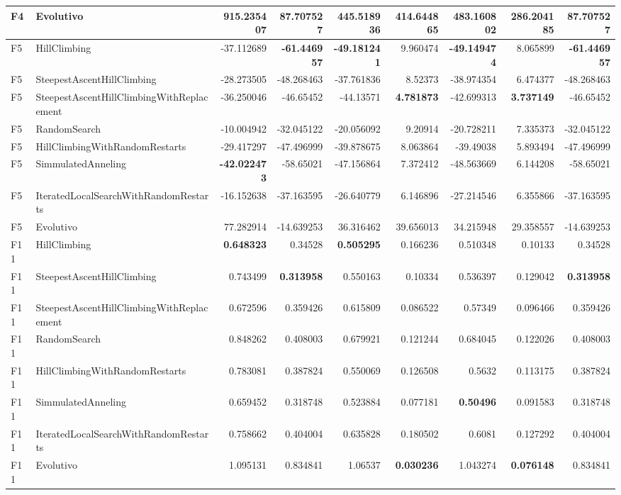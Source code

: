 \begin{tabular}{llrrrrrrr}
F4 & Evolutivo & 915.235407 & 87.707527 & 445.518936 & 414.644865 & 483.160802 & 286.204185 & 87.707527 \\ 
\midrule
F5 & HillClimbing & -37.112689 & \textbf{-61.446957} & \textbf{-49.181241} & 9.960474 & \textbf{-49.149474} & 8.065899 & \textbf{-61.446957} \\ 
F5 & SteepestAscentHillClimbing & -28.273505 & -48.268463 & -37.761836 & 8.52373 & -38.974354 & 6.474377 & -48.268463 \\ 
F5 & SteepestAscentHillClimbingWithReplacement & -36.250046 & -46.65452 & -44.13571 & \textbf{4.781873} & -42.699313 & \textbf{3.737149} & -46.65452 \\ 
F5 & RandomSearch & -10.004942 & -32.045122 & -20.056092 & 9.20914 & -20.728211 & 7.335373 & -32.045122 \\ 
F5 & HillClimbingWithRandomRestarts & -29.417297 & -47.496999 & -39.878675 & 8.063864 & -39.49038 & 5.893494 & -47.496999 \\ 
F5 & SimmulatedAnneling & \textbf{-42.022473} & -58.65021 & -47.156864 & 7.372412 & -48.563669 & 6.144208 & -58.65021 \\ 
F5 & IteratedLocalSearchWithRandomRestarts & -16.152638 & -37.163595 & -26.640779 & 6.146896 & -27.214546 & 6.355866 & -37.163595 \\ 
F5 & Evolutivo & 77.282914 & -14.639253 & 36.316462 & 39.656013 & 34.215948 & 29.358557 & -14.639253 \\ 
\midrule
F11 & HillClimbing & \textbf{0.648323} & 0.34528 & \textbf{0.505295} & 0.166236 & 0.510348 & 0.10133 & 0.34528 \\ 
F11 & SteepestAscentHillClimbing & 0.743499 & \textbf{0.313958} & 0.550163 & 0.10334 & 0.536397 & 0.129042 & \textbf{0.313958} \\ 
F11 & SteepestAscentHillClimbingWithReplacement & 0.672596 & 0.359426 & 0.615809 & 0.086522 & 0.57349 & 0.096466 & 0.359426 \\ 
F11 & RandomSearch & 0.848262 & 0.408003 & 0.679921 & 0.121244 & 0.684045 & 0.122026 & 0.408003 \\ 
F11 & HillClimbingWithRandomRestarts & 0.783081 & 0.387824 & 0.550069 & 0.126508 & 0.5632 & 0.113175 & 0.387824 \\ 
F11 & SimmulatedAnneling & 0.659452 & 0.318748 & 0.523884 & 0.077181 & \textbf{0.50496} & 0.091583 & 0.318748 \\ 
F11 & IteratedLocalSearchWithRandomRestarts & 0.758662 & 0.404004 & 0.635828 & 0.180502 & 0.6081 & 0.127292 & 0.404004 \\ 
F11 & Evolutivo & 1.095131 & 0.834841 & 1.06537 & \textbf{0.030236} & 1.043274 & \textbf{0.076148} & 0.834841 \\ 
\bottomrule
\end{tabular}
